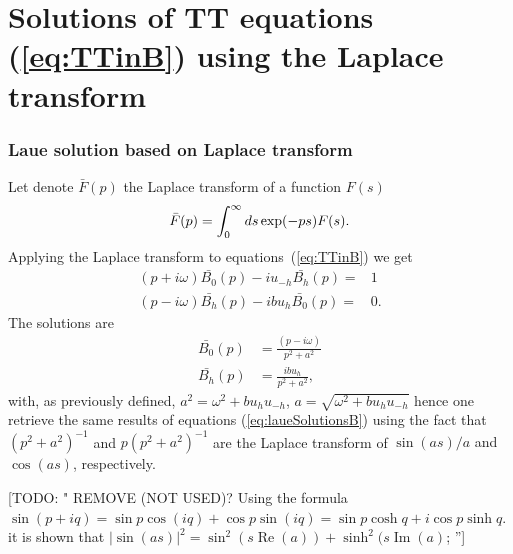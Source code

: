 \documentclass[preprint]{iucr}              %
\newcommand{\todo}[1]{{\color{red}[TODO: "#1'']}}
\newcommand{\inred}[1]{{\color{red}#1}}
\begin{document}
\section{Solutions of TT equations (\ref{eq:TTinB}) using the Laplace transform}
\label{appendix:laplace}


\subsubsection{Laue solution based on Laplace transform}
\label{sec:laplaceLaue}
Let denote $\bar{F}(p)$ the Laplace transform of a function $F(s)$
\begin{equation}
\Bar{F}(p) = \int_0^\infty ds \exp(-p s) F(s).
\end{equation}
Applying the Laplace transform to equations~(\ref{eq:TTinB}) we get
\begin{subequations}
\label{eq:TTlaueLaplace}
\begin{align}
(p + i \omega) \bar{B_0}(p) - i u_{-h} \bar{B_h}(p)= & 1 \\
(p - i \omega) \bar{B_h}(p) - i b u_{h} \bar{B_0}(p)= & 0.
\end{align}
\end{subequations}
The solutions are
\begin{subequations}
\begin{align}
\bar{B_0}(p) &= \frac{(p - i \omega) }{p^2 + a^2} \\
\bar{B_h}(p) &= \frac{i b u_h}{p^2 + a^2},
\end{align}
\end{subequations}
with, \inred{as previously defined,} $a^2=\omega^2 + b u_h u_{-h}$, $a=\sqrt{\omega^2+b u_h u_{-h}}$
hence one retrieve the same results of equations (\ref{eq:laueSolutionsB}) using the fact that  $(p^2+a^2)^{-1}$ and $p(p^2+a^2)^{-1}$ are the Laplace transform of \inred{ $\sin(a s)/a$ and $\cos(a s)$}, respectively. 

\todo{ REMOVE (NOT USED)? Using the formula $\sin(p+i q)=\sin p \cos(i q) + \cos p \sin(i q)=\sin p \cosh q + i \cos p \sinh q$. it is shown that $|\sin(a s)|^2=\sin^2(s \operatorname{Re}(a)) + \sinh^2(s \operatorname{Im}(a)$;
}
\end{document}
